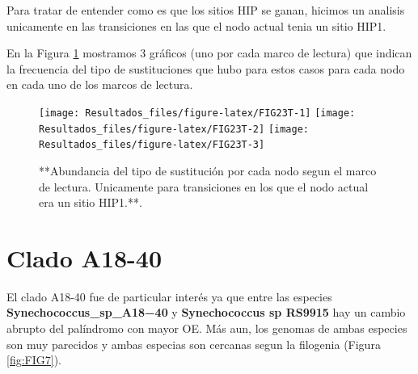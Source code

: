 \documentclass[
]{book}
\begin{document}
Para tratar de entender como es que los sitios HIP se ganan, hicimos un analisis unicamente en las transiciones en las que el nodo actual tenia un sitio HIP1.

En la Figura \ref{fig:FIG23T} mostramos 3 gráficos (uno por cada marco de lectura) que indican la frecuencia del tipo de sustituciones que hubo para estos casos para cada nodo en cada uno de los marcos de lectura.

\begin{figure}

{\centering \texttt{[image: Resultados\_files/figure-latex/FIG23T-1]} \texttt{[image: Resultados\_files/figure-latex/FIG23T-2]} \texttt{[image: Resultados\_files/figure-latex/FIG23T-3]} 

}

\caption{**Abundancia del tipo de sustitución por cada nodo segun el marco de lectura. Unicamente para transiciones en los que el nodo actual era un sitio HIP1.**.}\label{fig:FIG23T}
\end{figure}

\hypertarget{clado-a18-40}{%
\section{Clado A18-40}\label{clado-a18-40}}

El clado A18-40 fue de particular interés ya que entre las especies \textbf{Synechococcus\_sp\_A18−40} y \textbf{Synechococcus sp RS9915} hay un cambio abrupto del palíndromo con mayor OE. Más aun, los genomas de ambas especies son muy parecidos y ambas especias son cercanas segun la filogenia (Figura \ref{fig:FIG7}).
\end{document}
